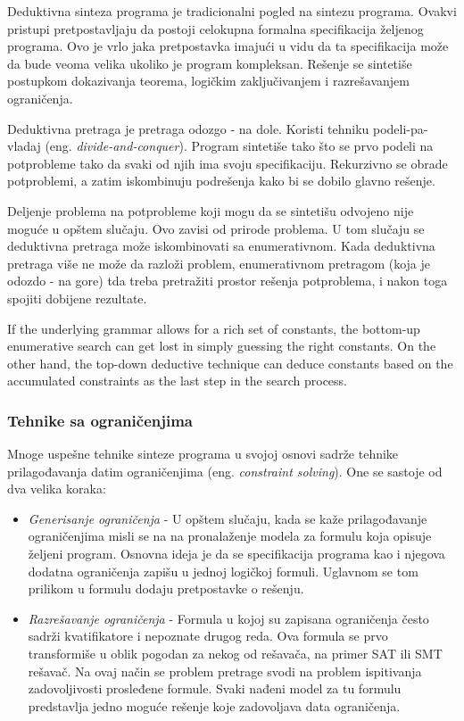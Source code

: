 Deduktivna sinteza programa je tradicionalni pogled na sintezu programa. Ovakvi pristupi pretpostavljaju da postoji celokupna formalna specifikacija željenog programa. Ovo je vrlo jaka pretpostavka imajući u vidu da ta specifikacija može da bude veoma velika ukoliko je program kompleksan. Rešenje se sintetiše postupkom dokazivanja teorema, logičkim zaključivanjem i razrešavanjem ograničenja.

Deduktivna pretraga je pretraga odozgo - na dole. Koristi tehniku podeli-pa-vladaj (eng. \emph{divide-and-conquer}). Program sintetiše tako što se prvo podeli na potprobleme tako da svaki od njih ima svoju specifikaciju. Rekurzivno se obrade potproblemi, a zatim iskombinuju podrešenja kako bi se dobilo glavno rešenje.

Deljenje problema na potprobleme koji mogu da se sintetišu odvojeno nije moguće u opštem slučaju. Ovo zavisi od prirode problema. U tom slučaju se deduktivna pretraga može iskombinovati sa enumerativnom. Kada deduktivna pretraga više ne može da razloži problem, enumerativnom pretragom (koja je odozdo - na gore) tda treba pretražiti prostor rešenja potproblema, i nakon toga spojiti dobijene rezultate.


If the underlying grammar allows for a rich set of constants,
the bottom-up enumerative search can get lost in simply guessing the
right constants. On the other hand, the top-down deductive technique
can deduce constants based on the accumulated constraints as the last
step in the search process.


\subsubsection{Tehnike sa ograničenjima}
\label{subsubsec:ConstraintSolving}

Mnoge uspešne tehnike sinteze programa u svojoj osnovi sadrže tehnike prilagođavanja datim ograničenjima (eng. \emph{constraint solving}). One se sastoje od dva velika koraka:
\begin{itemize}
  \item \emph{Generisanje ograničenja} - U opštem slučaju, kada se kaže prilagođavanje ograničenjima misli se na na pronalaženje modela za formulu koja opisuje željeni program. Osnovna ideja je da se specifikacija programa kao i njegova dodatna ograničenja zapišu u jednoj logičkoj formuli. Uglavnom se tom prilikom u formulu dodaju pretpostavke o rešenju.
  \item \emph{Razrešavanje ograničenja} - Formula u kojoj su zapisana ograničenja često sadrži kvatifikatore i nepoznate drugog reda. Ova formula se prvo transformiše u oblik pogodan za nekog od rešavača, na primer SAT ili SMT rešavač. Na ovaj način se problem pretrage svodi na problem ispitivanja zadovoljivosti prosleđene formule. Svaki nađeni model za tu formulu predstavlja jedno moguće rešenje koje zadovoljava data ograničenja.
\end{itemize}

